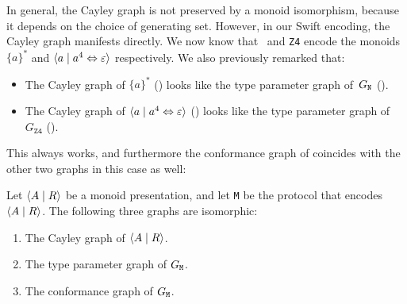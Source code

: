 \documentclass[../generics]{subfiles}
\begin{document}
In general, the Cayley graph is not preserved by a monoid isomorphism, because it depends on the choice of generating set. However, in our Swift encoding, the Cayley graph manifests directly. We now know that \tN\ and \texttt{Z4} encode the monoids $\{a\}^*$ and $\langle a \mid a^4\Leftrightarrow\varepsilon\rangle$ respectively. We also previously remarked that:
\begin{itemize}
\item The Cayley graph of $\{a\}^*$ () looks like the type parameter graph of~$G_{\texttt{N}}$ ().
\item The Cayley graph of $\langle a \mid a^4\Leftrightarrow\varepsilon\rangle$ () looks like the type parameter graph of~$G_\texttt{Z4}$ ().
\end{itemize}
This always works, and furthermore the conformance graph of  coincides with the other two graphs in this case as well:
\begin{theorem}
Let $\langle A \mid R\rangle$ be a monoid presentation, and let \texttt{M} be the protocol that encodes $\langle A \mid R\rangle$. The following three graphs are isomorphic:
\begin{enumerate}
\item The Cayley graph of $\langle A \mid R\rangle$.
\item The type parameter graph of $G_\texttt{M}$.
\item The conformance graph of $G_\texttt{M}$.
\end{enumerate}
\end{theorem}
\end{document}
